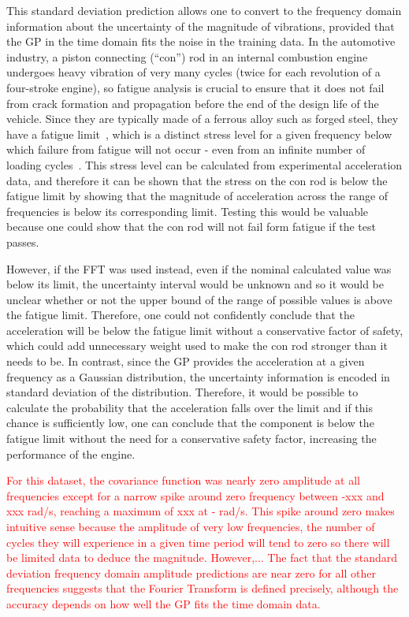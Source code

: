 \documentclass[12pt]{article}
\begin{document}
    This standard deviation prediction allows one to convert to the frequency domain information about the uncertainty of the magnitude of vibrations, provided that the GP in the time domain fits the noise in the training data.
    In the automotive industry, a piston connecting (``con'') rod in an internal combustion engine undergoes heavy vibration of very many cycles (twice for each revolution of a four-stroke engine), so fatigue analysis is crucial to ensure that it does not fail from crack formation and propagation before the end of the design life of the vehicle.
    Since they are typically made of a ferrous alloy such as forged steel, they have a fatigue limit~\cite{RoymechFatigue}, which is a distinct stress level for a given frequency below which failure from fatigue will not occur - even from an infinite number of loading cycles~\cite{BeerJohnston1992}.
    This stress level can be calculated from experimental acceleration data, and therefore it can be shown that the stress on the con rod is below the fatigue limit by showing that the magnitude of acceleration across the range of frequencies is below its corresponding limit.
    Testing this would be valuable because one could show that the con rod will not fail form fatigue if the test passes.

    However, if the FFT was used instead, even if the nominal calculated value was below its limit, the uncertainty interval would be unknown and so it would be unclear whether or not the upper bound of the range of possible values is above the fatigue limit.
    Therefore, one could not confidently conclude that the acceleration will be below the fatigue limit without a conservative factor of safety, which could add unnecessary weight used to make the con rod stronger than it needs to be.
    In contrast, since the GP provides the acceleration at a given frequency as a Gaussian distribution, the uncertainty information is encoded in standard deviation of the distribution.
    Therefore, it would be possible to calculate the probability that the acceleration falls over the limit and if this chance is sufficiently low, one can conclude that the component is below the fatigue limit without the need for a conservative safety factor, increasing the performance of the engine.

    \textcolor{red}{For this dataset, the covariance function was nearly zero amplitude at all frequencies except for a narrow spike around zero frequency between -xxx and xxx rad/s, reaching a maximum of xxx at - rad/s.
    This spike around zero makes intuitive sense because the amplitude of very low frequencies, the number of cycles they will experience in a given time period will tend to zero so there will be limited data to deduce the magnitude.
    However,...
    The fact that the standard deviation frequency domain amplitude predictions are near zero for all other frequencies suggests that the Fourier Transform is defined precisely, although the accuracy depends on how well the GP fits the time domain data.}
\end{document}

